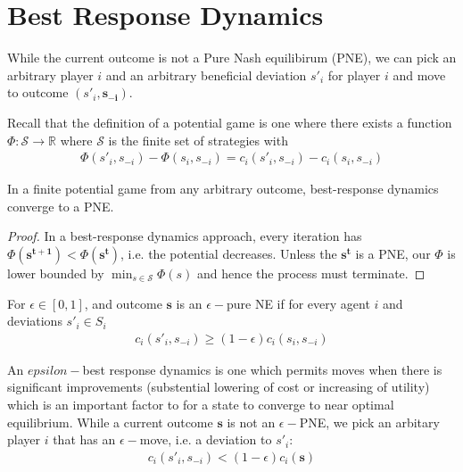 
\section{Best Response Dynamics}
While the current outcome is not a Pure Nash equilibirum (PNE), we can pick an arbitrary player $i$ and an arbitrary beneficial deviation $s'_i$ for player $i$ and move to outcome $(s'_i,\mathbf{s_{-i}})$.

Recall that the definition of a potential game is one where there exists a function $\Phi:\mathcal{S}\to \mathbb{R}$ where $\mathcal{S}$ is the finite set of strategies with
\begin{align*}
\Phi(s'_i,s_{-i})-\Phi(s_i,s_{-i})=c_i(s'_i,s_{-i})-c_i(s_i,s_{-i})
\end{align*}

\begin{prop}
In a finite potential game from any arbitrary outcome, best-response dynamics converge to a PNE.
\begin{proof}
In a best-response dynamics approach, every iteration has $\Phi(\mathbf{s^{t+1}})<\Phi(\mathbf{s^t})$, i.e. the potential decreases. Unless the $\mathbf{s^t}$ is a PNE, our $\Phi$ is lower bounded by $\min_{s\in \mathcal{S}}\Phi(s)$ and hence the process must terminate.
\end{proof}
\end{prop}

\begin{defn}
For $\epsilon \in [0,1]$, and outcome $\mathbf{s}$ is an $\epsilon-$pure NE if for every agent $i$ and deviations $s'_i\in S_i$
\begin{align*}
c_i(s'_i,s_{-i})\geq (1-\epsilon)c_i(s_i,s_{-i})
\end{align*}
\end{defn}

An $epsilon-$best response dynamics is one which permits moves when there is significant improvements (substential lowering of cost or increasing of utility) which is an important factor to for a state to converge to near optimal equilibrium. While a current outcome $\mathbf{s}$ is not an $\epsilon-$PNE, we pick an arbitary player $i$ that has an $\epsilon-$move, i.e. a deviation to $s'_i$:
\begin{align*}
c_i(s'_i,s_{-i})<(1-\epsilon)c_i(\mathbf{s})
\end{align*}

